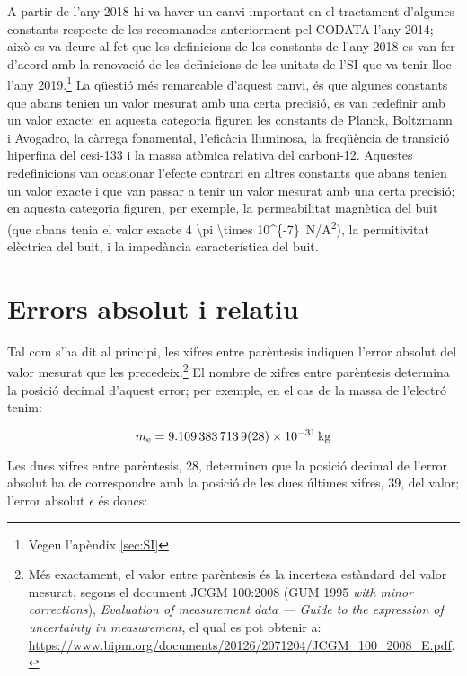A partir de l'any 2018 hi va haver un canvi important en el tractament d'algunes constants respecte de les recomanades anteriorment pel CODATA l'any 2014; això es va deure al fet que les definicions de les constants de l'any 2018 es van fer d'acord amb la renovació de les definicions de les unitats de l'SI que va tenir lloc l'any 2019.\footnote{Vegeu l'apèndix \ref{sec:SI}} La qüestió més remarcable d'aquest canvi, és que algunes constants que abans tenien un valor mesurat amb una certa precisió, es van redefinir amb un valor exacte; en aquesta categoria figuren les constants de Planck, Boltzmann i Avogadro, la càrrega fonamental, l'eficàcia lluminosa, la freqüència de transició hiperfina del cesi-133 i la massa atòmica relativa del carboni-12. Aquestes redefinicions van ocasionar l'efecte contrari en altres constants que abans tenien un valor exacte i que van passar a tenir un valor mesurat amb una certa precisió; en aquesta categoria figuren, per exemple, la permeabilitat  magnètica del buit (que abans tenia el valor exacte \qty[parse-numbers = false]{4 \pi \times 10^{-7}}{N/A^2}), la permitivitat elèctrica del buit, i la impedància característica del buit.


\section{Errors absolut i relatiu}\label{sec:err_abs_rel}

Tal com s'ha dit al principi, les xifres entre parèntesis indiquen l'error absolut del valor mesurat que les precedeix.\footnote{Més exactament, el valor entre parèntesis és la incertesa estàndard del valor mesurat, segons el document JCGM 100:2008 (GUM 1995 \textit{with minor
corrections}), \textit{Evaluation of measurement data --- Guide to the expression of uncertainty in
measurement}, el qual es pot obtenir a:  \href{https://www.bipm.org/documents/20126/2071204/JCGM_100_2008_E.pdf/}{https:/\!\!/www.bipm.org/documents/20126/2071204/JCGM\_100\_2008\_E.pdf}.} El nombre de xifres entre parèntesis determina la posició decimal d'aquest error; per exemple, en el cas de la  massa de l'electró tenim:

\[
    m_\mathrm{e} = \qty{9,109 383 7139(28) e-31}{kg}
\]

Les dues xifres entre parèntesis, 28, determinen que la posició decimal de l'error absolut ha de correspondre amb la posició de les dues últimes xifres, 39, del valor; l'error absolut $\epsilon$  és doncs:

